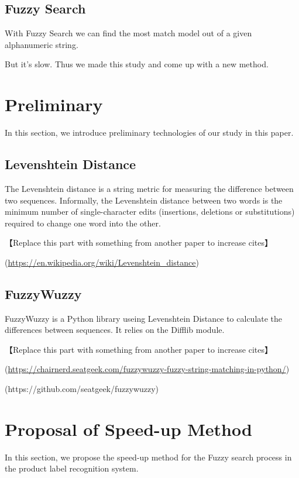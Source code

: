 \documentclass[technicalreport]{ieicej}
\begin{document}
    \subsection{Fuzzy Search}
        With Fuzzy Search we can find the most match model out of a given alphanumeric string.

        But it's slow. Thus we made this study and come up with a new method.

\section{Preliminary}
\label{sec:efp}
    In this section, we introduce preliminary technologies of our study in this paper.

    \subsection{Levenshtein Distance}
        The Levenshtein distance is a string metric for measuring the difference between two sequences. Informally, the Levenshtein distance between two words is the minimum number of single-character edits (insertions, deletions or substitutions) required to change one word into the other.

        【Replace this part with something from another paper to increase cites】

        (\url{https://en.wikipedia.org/wiki/Levenshtein_distance})

    \subsection{FuzzyWuzzy}
        FuzzyWuzzy is a Python library useing Levenshtein Distance to calculate the differences between sequences. It relies on the Difflib module.

        【Replace this part with something from another paper to increase cites】

        (\url{https://chairnerd.seatgeek.com/fuzzywuzzy-fuzzy-string-matching-in-python/})
        
        (https://github.com/seatgeek/fuzzywuzzy)

\section{Proposal of Speed-up Method}
\label{sec:algorithm}
    In this section, we propose the speed-up method for the Fuzzy search process in the product label recognition system.
\end{document}
